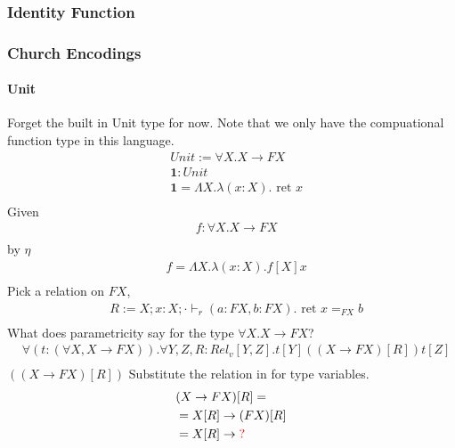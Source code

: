 \documentclass{article}
\begin{document}
\subsubsection{Identity Function}

\begin{prooftree}
\end{prooftree}

\subsubsection{Church Encodings}
\paragraph{Unit}
Forget the built in Unit type for now. Note that we only have the compuational function type in this language.
\begin{align*}
    &Unit := \forall X . X \rightarrow F X\\
    &\mathbf{1} : Unit\\
    &\mathbf{1} = \Lambda X . \lambda (x : X) . \textrm{ ret } x\\
\end{align*}
Given 
\begin{align*}
    &f : \forall X . X \rightarrow F X\\
\end{align*}
by $\eta$
\begin{align*}
    &f = \Lambda X . \lambda (x : X). f[X] x\\
\end{align*}
Pick a relation on $FX$,
\begin{align*}
    &R := X ; x : X ; \cdot \vdash_r (a : F X , b : F X). \textrm{ ret } x =_{FX} b\\
\end{align*}
What does parametricity say for the type $\forall X . X \rightarrow F X$?
\begin{align*}
    &\forall (t : (\forall X, X \rightarrow FX)).\forall Y, Z, R : Rel_v[Y,Z].t[Y]((X \rightarrow F X)[R])t[Z]\\
\end{align*}
$((X \rightarrow F X)[R])$ Substitute the relation in for type variables.
\begin{align*}
    &(X \rightarrow F X)[R] =\\
    &= X[R] \rightarrow (FX)[R]\\
    &= X[R] \rightarrow \red{?}\\
\end{align*}
\end{document}
